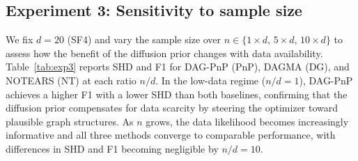 \documentclass[conference]{IEEEtran}
\begin{document}

    
    \subsection{Experiment 3: Sensitivity to sample size}
    \label{ssec:exp3}
    
    We fix $d = 20$ (SF4) and vary the sample size over
    $n \in \{1{\times}d,\, 5{\times}d,\, 10{\times}d\}$ to assess how the benefit of the diffusion prior changes with data availability.
    Table~\ref{tab:exp3} reports SHD and F1 for DAG-PnP (PnP), DAGMA (DG),
    and NOTEARS (NT) at each ratio $n/d$.
    In the low-data regime ($n/d = 1$), DAG-PnP achieves a 
    higher F1 with a lower SHD than both baselines, confirming that the diffusion prior compensates for data scarcity by steering the optimizer toward plausible graph structures.
    As $n$ grows, the data likelihood becomes increasingly informative and all three methods converge to comparable performance, with differences in SHD and F1 becoming negligible by $n/d = 10$. 
    
\end{document}
